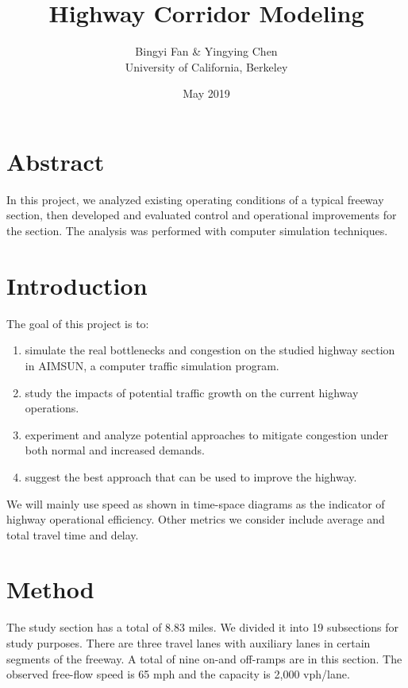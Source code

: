 \documentclass{article}
\begin{document}
\title{Highway Corridor Modeling}
\author{Bingyi Fan & Yingying Chen \\ \bigskip University of California, Berkeley}
\date{May 2019}

\maketitle
\newpage
\tableofcontents

\newpage
\section{Abstract}
In this project, we analyzed existing operating conditions of a typical freeway section, then developed and evaluated control and operational improvements for the section. The analysis was performed with computer simulation techniques.

\section{Introduction}
The goal of this project is to: \begin{enumerate}
    \item simulate the real bottlenecks and congestion on the studied highway section in AIMSUN, a computer traffic simulation program.
    \item study the impacts of potential traffic growth on the current highway operations.
    \item experiment and analyze potential approaches to mitigate congestion under both normal and increased demands.
    \item suggest the best approach that can be used to improve the highway.
\end{enumerate}

We will mainly use speed as shown in time-space diagrams as the indicator of highway operational efficiency. Other metrics we consider include average and total travel time and delay.

\section{Method}
The study section has a total of 8.83 miles. We divided it into 19 subsections for study purposes. There are three travel lanes with auxiliary lanes in certain segments of the freeway. A total of nine on-and off-ramps are in this section. The observed free-flow speed is 65 mph and the capacity is 2,000 vph/lane. 
\bigskip
\end{document}
